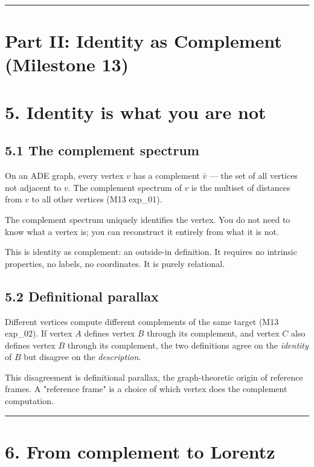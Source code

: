 \documentclass[11pt,a4paper]{article}
\begin{document}
\begin{center}\rule{0.5\linewidth}{0.4pt}\end{center}

\section*{Part II: Identity as Complement (Milestone 13)}

\section*{5. Identity is what you are not}

\subsection*{5.1 The complement spectrum}

On an ADE graph, every vertex $v$ has a complement $\bar{v}$ — the set of all vertices not adjacent to $v$. The complement spectrum of $v$ is the multiset of distances from $v$ to all other vertices (M13 exp\_01).

The complement spectrum uniquely identifies the vertex. You do not need to know what a vertex is; you can reconstruct it entirely from what it is not.

This is identity as complement: an outside-in definition. It requires no intrinsic properties, no labels, no coordinates. It is purely relational.

\subsection*{5.2 Definitional parallax}

Different vertices compute different complements of the same target (M13 exp\_02). If vertex $A$ defines vertex $B$ through its complement, and vertex $C$ also defines vertex $B$ through its complement, the two definitions agree on the \emph{identity} of $B$ but disagree on the \emph{description}.

This disagreement is definitional parallax, the graph-theoretic origin of reference frames. A "reference frame" is a choice of which vertex does the complement computation.

\begin{center}\rule{0.5\linewidth}{0.4pt}\end{center}

\section*{6. From complement to Lorentz}
\end{document}
